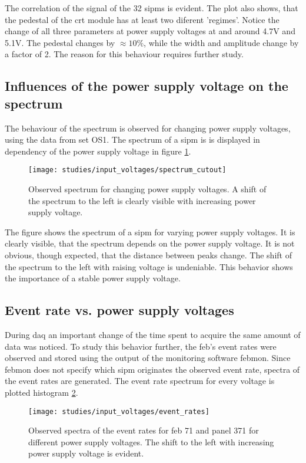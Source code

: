 The correlation of the signal of the 32 \glspl{sipm} is evident.
The plot also shows, that the pedestal of the \gls{crt} module has at least two diferent 'regimes'.
Notice the change of all three parameters at power supply voltages at and around 4.7V and 5.1V.
The pedestal changes by $\approx10\%$, while the width and amplitude change by a factor of 2.
The reason for this behaviour requires further study.

\subsection{Influences of the power supply voltage on the spectrum}

The behaviour of the spectrum is observed for changing power supply voltages, using the data from set OS1.
The spectrum of a \gls{sipm} is is displayed in dependency of the power supply voltage in figure \ref{fig:spectrum_input}.
\begin{figure}
  \centering
  \texttt{[image: studies/input\_voltages/spectrum\_cutout]}
  \caption{%
    Observed spectrum for changing power supply voltages.
    A shift of the spectrum to the left is clearly visible with increasing power supply voltage.
  }
  \label{fig:spectrum_input}
\end{figure}

The figure shows the spectrum of a \gls{sipm} for varying power supply voltages.
It is clearly visible, that the spectrum depends on the power supply voltage.
It is not obvious, though expected, that the distance between peaks change.
The shift of the spectrum to the left with raising voltage is undeniable.
This behavior shows the importance of a stable power supply voltage.

\subsection{Event rate vs. power supply voltages}

During \gls{daq} an important change of the time spent to acquire the same amount of data was noticed.
To study this behavior further, the \gls{feb}'s event rates were observed and stored using the output of the monitoring software febmon.
Since febmon does not specify which \gls{sipm} originates the observed event rate, spectra of the event rates are generated.
The event rate spectrum for every voltage is plotted histogram \ref{fig:eventrate_input}.

\begin{figure}
  \centering
  \texttt{[image: studies/input\_voltages/event\_rates]}
  \caption{%
    Observed spectra of the event rates for \gls{feb} 71 and panel 371 for different power supply voltages.
    The shift to the left with increasing power supply voltage is evident.
  }
  \label{fig:eventrate_input}
\end{figure}

